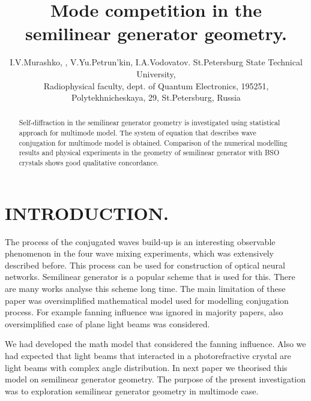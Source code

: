 \title{Mode competition in the semilinear generator geometry.} 

\author{I.V.Murashko, , V.Yu.Petrun'kin, I.A.Vodovatov.
\skiplinehalf St.Petersburg State Technical University,\\
Radiophysical faculty, dept. of Quantum Electronics, 195251,\\
Polytekhnicheskaya, 29, St.Petersburg, Russia}



\maketitle

\begin{abstract}
{Self-diffraction in the semilinear generator geometry is
investigated using statistical approach for multimode model.
The system of equation that describes wave conjugation for multimode
model is obtained. Comparison of the numerical
modelling results and physical experiments in the geometry of
semilinear generator with  BSO crystals shows good qualitative
concordance.} 
\end{abstract}


\section{INTRODUCTION.}

\noindent The process of the conjugated waves build-up is an
interesting observable phenomenon in the four wave mixing
experiments, which was extensively described
before\cite{Horowitz1991,Bel'dyugina1992,Dynamics}. This process can
be used for construction of optical neural networks\cite{Psaltis,ART}.
Semilinear
generator is a popular scheme that is used for this. There are many
works analyse this scheme long time\cite{bFirstSemi,Zozulya}. The main
limitation of these paper was oversimplified mathematical model used
for modelling conjugation process. For example fanning 
influence was ignored in majority papers, also oversimplified case of
plane light beams was considered. 

We had developed the math model\cite{ourDPCM} that considered the fanning
influence. Also we had expected that light beams that interacted in a
photorefractive crystal are light beams with complex angle
distribution. In next paper  \cite{ourSemi} we theorised this
model on semilinear generator geometry. 
The purpose of the present investigation was to exploration semilinear
generator geometry in multimode case.\\
